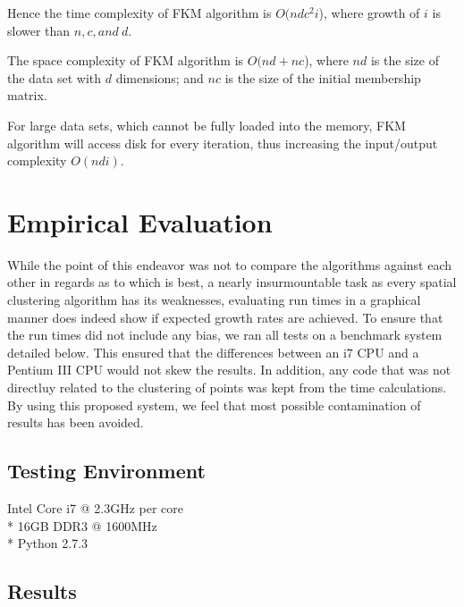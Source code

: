 \documentclass[conference, 10pt]{IEEEtran}
\begin{document}
  Hence the time complexity of FKM algorithm is $O(ndc^2i$), where growth of $i$ is slower than $n, c, and\:d$.

  The space complexity of FKM algorithm is $O(nd+nc$), where $nd$ is the size of the data set with $d$ dimensions; and $nc$ is the size of the initial membership matrix.

  For large data sets, which cannot be fully loaded into the memory, FKM algorithm will access
  disk for every iteration, thus increasing the input/output complexity $O(ndi)$.

  \section{Empirical Evaluation}
  While the point of this endeavor was not to compare the algorithms against each other in regards as to which is best, a nearly insurmountable task as every spatial clustering algorithm has its weaknesses, evaluating run times in a graphical manner does indeed show if expected growth rates are achieved. To ensure that the run times did not include any bias, we ran all tests on a benchmark system detailed below. This ensured that the differences between an i7 CPU and a Pentium III CPU would not skew the results. In addition, any code that was not directluy related to the clustering of points was kept from the time calculations. By using this proposed system, we feel that most possible contamination of results has been avoided.

  \subsection{Testing Environment}
  \begin{center}
  Intel Core i7 @ 2.3GHz per core\\*
  16GB DDR3 @ 1600MHz\\*
  Python 2.7.3
  \end{center}

  \subsection{Results}
\end{document}
